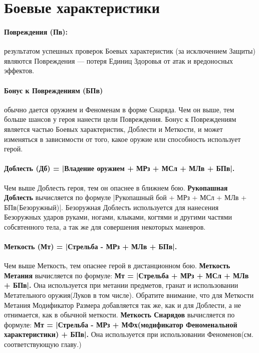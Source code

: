\section{Боевые характеристики}
\paragraph{Повреждения (Пв):} результатом успешных проверок Боевых характеристик (за исключением Защиты) являются Повреждения — потеря Единиц Здоровья от атак и вредоносных эффектов.
\paragraph{Бонус к Повреждениям (БПв)} обычно дается оружием и Феноменам в форме Снаряда. Чем он выше, тем больше шансов у героя нанести цели Повреждения. Бонус к Повреждениям является частью Боевых характеристик, Доблести и Меткости, и может изменяться в зависимости от того, какое оружие или способность использует герой.
\paragraph{Доблесть (Дб) = |Владение оружием + МРз + МСл + МЛв + БПв|.} Чем выше Доблесть героя, тем он опаснее в ближнем бою.
\newline \textbf{Рукопашная Доблесть} вычисляется по формуле |Рукопашный бой + МРз + МСл + МЛв + БПв(Безоружный)|. Безоружная Доблесть используется для нанесения Безоружных ударов руками, ногами, клыками, когтями и другими частями собсвтенного тела, а так же для совершения некоторых маневров.
\paragraph{Меткость (Мт) = |Стрельба - МРз + МЛв + БПв|.} Чем выше Меткость, тем опаснее герой в дистанционном бою.
\newline \textbf{Меткость Метания} вычисляется по формуле: \textbf{Мт = |Стрельба + МРз + МСл + МЛв + БПв|.} Она используется при метании предметов, гранат и использовании Метательного оружия(Луков в том числе). Обратите внимание, что для Меткости Метания Модификатор Размера добавляется так же, как и для Доблести, а не отнимается, как в обычной меткости.
\newline \textbf{Меткость Снарядов} вычисляется по формуле: \textbf{Мт = |Стрельба - МРз + МФх(модификатор Феноменальной характеристики) + БПв|.} Она используется при использовании Феноменов(см. соответствующую главу.)
